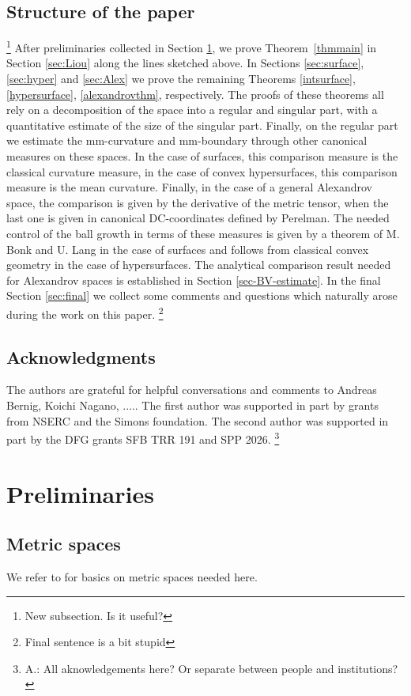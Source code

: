 \documentclass[12pt,leqno,intlimits]{amsart}
\numberwithin{equation}{section}
\theoremstyle{definition}
\theoremstyle{remark}
\newcommand{\tref}[1]{Theorem~\ref{#1}}
\begin{document}
\subsection{Structure of the paper} \footnote{New subsection. Is it useful?}
After preliminaries collected in Section \ref{sec:prelim}, we prove \tref{thmmain} in Section \ref{sec:Liou} along the lines sketched above.
In Sections \ref{sec:surface}, \ref{sec:hyper}  and \ref{sec:Alex} we prove  the remaining Theorems \ref{intsurface}, \ref{hypersurface}, \ref{alexandrovthm}, respectively. The proofs of these theorems all rely on a decomposition of the space into a regular and singular part, with
a quantitative estimate of the size of the singular part. Finally, on the regular part we estimate the mm-curvature and mm-boundary through other
canonical measures  on these spaces. 
In the case of surfaces, this comparison measure is the classical curvature measure,  in the case of convex hypersurfaces, this comparison measure is the mean curvature.  Finally, in the case of a general  Alexandrov space, the comparison is given by the derivative of the metric tensor, when the last one is given in canonical DC-coordinates defined by Perelman. The needed control of the ball growth
in terms of these measures is given by a theorem of M. Bonk  and U. Lang in the case of surfaces  and follows from classical convex geometry in the case of hypersurfaces. The analytical comparison result  needed for Alexandrov spaces is established in Section \ref{sec-BV-estimate}. 
In the final
Section \ref{sec:final} we collect some comments and questions which naturally arose during the work on this paper. \footnote{Final sentence is a bit stupid}




\subsection{Acknowledgments}  The authors are grateful for helpful conversations and comments to Andreas Bernig, Koichi Nagano,  .....
The first author was supported in part by grants from NSERC and the Simons foundation. The second author was supported in part by the DFG grants  SFB TRR 191 and SPP 2026. \footnote{A.: All aknowledgements here? Or separate between people and institutions?}


\section{Preliminaries} \label{sec:prelim}
\subsection{Metric spaces}
We refer to \cite{BBI01} for basics on metric spaces needed here.
\end{document}
